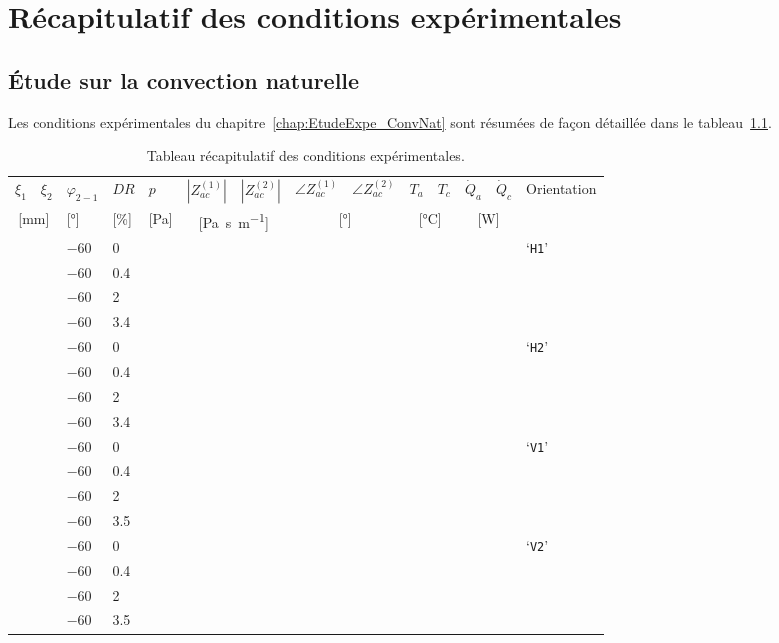 \chapter{Récapitulatif des conditions expérimentales}
\section{\'Etude sur la convection naturelle}
Les conditions expérimentales du chapitre~\ref{chap:EtudeExpe_ConvNat} sont résumées de façon détaillée dans le tableau~\ref{tab:RecapCondExpe}.

\begin{table}[!ht]
\centering
	\begin{tabular}{ llll llll llll ll}
	\hline
	$\xi_1$ & $\xi_2$ & $\varphi_{2-1}$  & $DR$ & $p$ & $|Z_{ac}^{(1)}|$ & $|Z_{ac}^{(2)}|$& $\angle Z_{ac}^{(1)}$  & $\angle Z_{ac}^{(2)}$ & $T_a$  & $T_c$ & $\dot Q_a$ & $\dot Q_c$  & \multirow{2}{*}{Orientation} \\%
	
	\multicolumn{2}{c}{[\unit{\milli\meter}]} & [\unit{\degree}] & [\unit{\percent}] & [\unit{\pascal}] & \multicolumn{2}{c}{[\unit{\pascal\second\per\meter}]} & \multicolumn{2}{c}{[\unit{\degree}]}  & \multicolumn{2}{c}{[\unit{\degreeCelsius}]} &\multicolumn{2}{c}{[\unit{\watt}]} &  \\\hline\hline
	 &  & \num{-60} & \num{0} & && & & &  & \num{} & & & \multirow{4}{*}{`\texttt{H1}'} \\
	 &  & \num{-60} & \num{.4} & && & & &  & \num{} & & &  \\
	 &  & \num{-60} & \num{2} & & &&&  &  & \num{} & & & \\
	 &  & \num{-60} & \num{3.4} & & & &&&  & \num{} & & &  \\	 
	 &  & \num{-60} & \num{0} & && & & &  & \num{} & & & \multirow{4}{*}{`\texttt{H2}'} \\
	 &  & \num{-60} & \num{.4} & & & &&& & \num{} & & & \\
	 &  & \num{-60} & \num{2} & & &&& & & \num{} & & & \\
	 &  & \num{-60} & \num{3.4} & & & &&& & \num{} & & & \\
	 &  & \num{-60} & \num{0} & && & & &  & \num{} & & & \multirow{4}{*}{`\texttt{V1}'} \\
	 &  & \num{-60} & \num{.4} & & & & &&& \num{} & & & \\
	 &  & \num{-60} & \num{2} &  & & &&& & \num{} & & & \\
	 &  & \num{-60} & \num{3.5} &  & & &&& & \num{} & & & \\
	 &  & \num{-60} & \num{0} & && & & &  & \num{} & & & \multirow{4}{*}{`\texttt{V2}'} \\
	 &  & \num{-60} & \num{.4} & & && & && \num{} & & & \\
	 &  & \num{-60} & \num{2} & & & &&& & \num{} & & & \\
	 &  & \num{-60} & \num{3.5} &  & & & & \num{} & & & \\
	 \hline
	
	\end{tabular}
	\caption{Tableau récapitulatif des conditions expérimentales.}
	\label{tab:RecapCondExpe}
\end{table}

